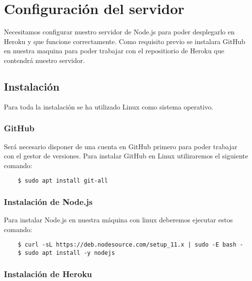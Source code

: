 \section{Configuración del servidor}

Necesitamos configurar nuestro servidor de Node.js para poder desplegarlo en Heroku y que funcione correctamente.
Como requisito previo se instalara GitHub en nuestra maquina para poder trabajar con el repositiorio de Heroku que contendrá nuestro servidor.

\subsection{Instalación}
Para toda la instalación se ha utilizado Linux como sistema operativo.
\subsubsection{GitHub}
Será necesario disponer de una cuenta en GitHub primero para poder trabajar con el gestor de versiones. Para instalar GitHub en Linux utilizaremos el siguiente comando:
\begin{lstlisting}
	$ sudo apt install git-all
\end{lstlisting}



\subsubsection{Instalación de Node.js}

Para instalar Node.js en nuestra máquina con linux deberemos ejecutar estos comando:

\begin{lstlisting}
	$ curl -sL https://deb.nodesource.com/setup_11.x | sudo -E bash -
	$ sudo apt install -y nodejs
\end{lstlisting}




\subsubsection{Instalación de Heroku} 

